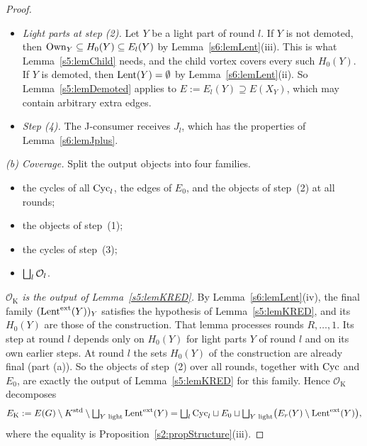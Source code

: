 \begin{proof}
\begin{itemize}
\begin{itemize}
  \end{itemize}
\item \emph{Light parts at step (2).} Let $Y$ be a light part of round $l$. If $Y$ is not demoted, then $\mathrm{Own}_Y\subseteq H_0(Y)\subseteq E_l(Y)$ by Lemma~\ref{s6:lemLent}(iii). This is what Lemma~\ref{s5:lemChild} needs, and the child vortex covers every such $H_0(Y)$. If $Y$ is demoted, then $\mathrm{Lent}(Y)=\emptyset$ by Lemma~\ref{s6:lemLent}(ii). So Lemma~\ref{s5:lemDemoted} applies to $E:=E_l(Y)\supseteq E(X_Y)$, which may contain arbitrary extra edges.
\item \emph{Step (4).} The J-consumer receives $J_l$, which has the properties of Lemma~\ref{s6:lemJplus}.
\end{itemize}

\emph{(b) Coverage.} Split the output objects into four families.
\begin{itemize}
\item[$\mathcal O_{\mathrm K}$:] the cycles of all $\mathrm{Cyc}_l$, the edges of $E_0$, and the objects of step~(2) at all rounds;
\item[$\mathcal O_{\mathrm T}$:] the objects of step~(1);
\item[$\mathcal O_{\mathrm S}$:] the cycles of step~(3);
\item[$\mathcal O_{\mathrm J}$:] $\bigsqcup_l\mathcal{O}_l$.
\end{itemize}

\emph{$\mathcal O_{\mathrm K}$ is the output of Lemma~\ref{s5:lemKRED}.} By Lemma~\ref{s6:lemLent}(iv), the final family $(\mathrm{Lent}^{\mathrm{ext}}(Y))_Y$ satisfies the hypothesis of Lemma~\ref{s5:lemKRED}, and its $H_0(Y)$ are those of the construction. That lemma processes rounds $R,\dots,1$. Its step at round $l$ depends only on $H_0(Y)$ for light parts $Y$ of round $l$ and on its own earlier steps. At round $l$ the sets $H_0(Y)$ of the construction are already final (part (a)). So the objects of step~(2) over all rounds, together with $\mathrm{Cyc}$ and $E_0$, are exactly the output of Lemma~\ref{s5:lemKRED} for this family. Hence $\mathcal O_{\mathrm K}$ decomposes
\[
E_{\mathrm K}:=E(G)\setminus K^{\mathrm{std}}\setminus\textstyle\bigsqcup_{Y\text{ light}}\mathrm{Lent}^{\mathrm{ext}}(Y)
=\bigsqcup_l\mathrm{Cyc}_l\sqcup E_0\sqcup\bigsqcup_{Y\text{ light}}\bigl(E_r(Y)\setminus\mathrm{Lent}^{\mathrm{ext}}(Y)\bigr),
\]
where the equality is Proposition~\ref{s2:propStructure}(iii).


\end{proof}
